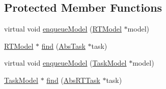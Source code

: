\subsection*{Protected Member Functions}
\begin{DoxyCompactItemize}
\item 
virtual void \hyperlink{classRTSim_1_1Scheduler_a424630d25fa6d9bf248d40e6555d72ce}{enqueue\+Model} (\hyperlink{classRTSim_1_1RTModel}{R\+T\+Model} $\ast$model)
\item 
\hyperlink{classRTSim_1_1RTModel}{R\+T\+Model} $\ast$ \hyperlink{classRTSim_1_1Scheduler_a07e63e1b5f47b38c6594467f8daf7e2a}{find} (\hyperlink{classRTSim_1_1AbsTask}{Abs\+Task} $\ast$task)
\item 
virtual void \hyperlink{classRTSim_1_1Scheduler_ac9305e7b9219d123f0c966f9c61f0966}{enqueue\+Model} (\hyperlink{classRTSim_1_1TaskModel}{Task\+Model} $\ast$model)
\item 
\hyperlink{classRTSim_1_1TaskModel}{Task\+Model} $\ast$ \hyperlink{classRTSim_1_1Scheduler_a519e7288a54404aeb7d6232b86bb8a24}{find} (\hyperlink{classRTSim_1_1AbsRTTask}{Abs\+R\+T\+Task} $\ast$task)
\end{DoxyCompactItemize}
